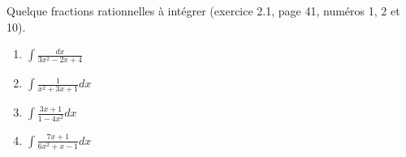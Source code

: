 \begin{exercice}\label{exo0018}

Quelque fractions rationnelles à intégrer (exercice 2.1, page 41, numéros 1, 2 et 10). 
\begin{enumerate}

\item
$\int \frac{ dx }{ 3x^2-2x+4 }$
\item
$\int \frac{ 1 }{ x^2+3x+1 } dx$
\item
$\int \frac{ 3x+1 }{ 1-4x^2 } dx$
\item
$\int \frac{ 7x+1 }{ 6x^2+x-1 } dx$

\end{enumerate}


\end{exercice}

